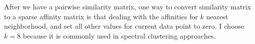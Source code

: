 After we have a pairwise similarity matrix, one way to convert similarity matrix to a sparse affinity matrix is that dealing with the affinities for $k$ nearest neighborhood, and set all other values for current data point to zero. 
I choose $k = 8$ because it is commonly used in spectral clustering approaches. 

